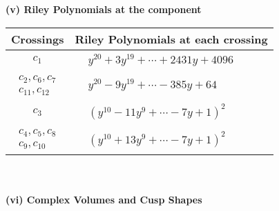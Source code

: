 \documentclass[1p]{elsarticle_modified}
\theoremstyle{definition}
\begin{document}
\newpage\renewcommand{\arraystretch}{1}
\flushleft \textbf{(v) Riley Polynomials at the component}\newline \\
\begin{tabular}{m{50pt}|m{274pt}}
Crossings & \hspace{64pt}Riley Polynomials at each crossing \\
\hline $$\begin{aligned}c_{1}\end{aligned}$$&$\begin{aligned}
&y^{20}+3 y^{19}+\cdots+2431 y+4096
\end{aligned}$\\
\hline $$\begin{aligned}c_{2},c_{6},c_{7}\\c_{11},c_{12}\end{aligned}$$&$\begin{aligned}
&y^{20}-9 y^{19}+\cdots-385 y+64
\end{aligned}$\\
\hline $$\begin{aligned}c_{3}\end{aligned}$$&$\begin{aligned}
&(y^{10}-11 y^9+\cdots-7 y+1)^{2}
\end{aligned}$\\
\hline $$\begin{aligned}c_{4},c_{5},c_{8}\\c_{9},c_{10}\end{aligned}$$&$\begin{aligned}
&(y^{10}+13 y^9+\cdots-7 y+1)^{2}
\end{aligned}$\\
\hline
\end{tabular}\\~\\
\newpage\flushleft \textbf{(vi) Complex Volumes and Cusp Shapes}
\end{document}
